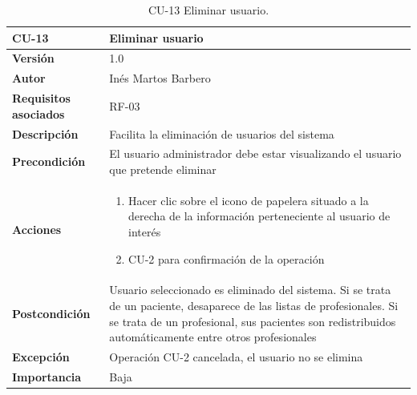 \begin{table}[p]
	\centering
	\begin{tabularx}{\linewidth}{ p{} p{} }
		\toprule
		\textbf{CU-13}    & \textbf{Eliminar usuario}\\
		\toprule
		\textbf{Versión}              & 1.0    \\
		\textbf{Autor}                & Inés Martos Barbero \\
		\textbf{Requisitos asociados} & RF-03 \\
		\textbf{Descripción}          & Facilita la eliminación de usuarios del sistema \\
		\textbf{Precondición}         & El usuario administrador debe estar visualizando el usuario que pretende eliminar \\
		\textbf{Acciones}             &
		\begin{enumerate}
			\def\labelenumi{\arabic{enumi}.}
			\tightlist
			\item Hacer clic sobre el icono de papelera situado a la derecha de la información perteneciente al usuario de interés
			\item CU-2 para confirmación de la operación
		\end{enumerate}\\
		\textbf{Postcondición}        & Usuario seleccionado es eliminado del sistema. Si se trata de un paciente, desaparece de las listas de profesionales. Si se trata de un profesional, sus pacientes son redistribuidos automáticamente entre otros profesionales \\
		\textbf{Excepción}          & Operación CU-2 cancelada, el usuario no se elimina \\
		\textbf{Importancia}          & Baja \\
		\bottomrule
	\end{tabularx}
	\caption{CU-13 Eliminar usuario.}
\end{table}

